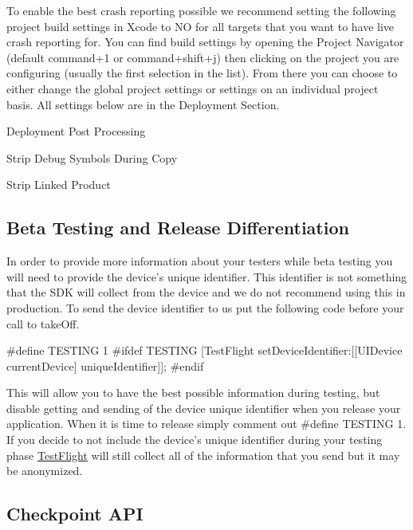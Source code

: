\begin{DoxyEnumerate}
\item To enable the best crash reporting possible we recommend setting the following project build settings in Xcode to N\-O for all targets that you want to have live crash reporting for. You can find build settings by opening the Project Navigator (default command+1 or command+shift+j) then clicking on the project you are configuring (usually the first selection in the list). From there you can choose to either change the global project settings or settings on an individual project basis. All settings below are in the Deployment Section.


\begin{DoxyEnumerate}
\item Deployment Post Processing
\item Strip Debug Symbols During Copy
\item Strip Linked Product
\end{DoxyEnumerate}
\end{DoxyEnumerate}

\subsection*{Beta Testing and Release Differentiation}

In order to provide more information about your testers while beta testing you will need to provide the device's unique identifier. This identifier is not something that the S\-D\-K will collect from the device and we do not recommend using this in production. To send the device identifier to us put the following code before your call to take\-Off. \begin{DoxyVerb}#define TESTING 1
#ifdef TESTING
    [TestFlight setDeviceIdentifier:[[UIDevice currentDevice] uniqueIdentifier]];
#endif
\end{DoxyVerb}


This will allow you to have the best possible information during testing, but disable getting and sending of the device unique identifier when you release your application. When it is time to release simply comment out \#define T\-E\-S\-T\-I\-N\-G 1. If you decide to not include the device's unique identifier during your testing phase \hyperlink{interface_test_flight}{Test\-Flight} will still collect all of the information that you send but it may be anonymized.

\subsection*{Checkpoint A\-P\-I}

